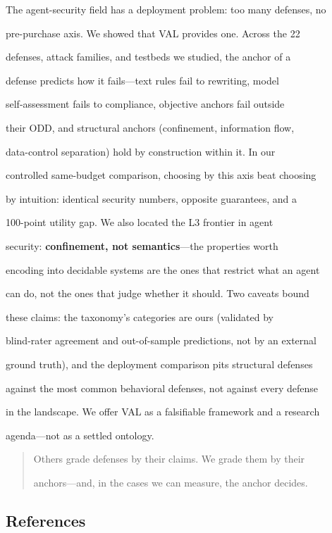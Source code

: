 \documentclass[

]{article}
\begin{document}
The agent-security field has a deployment problem: too many defenses, no

pre-purchase axis. We showed that VAL provides one. Across the 22

defenses, attack families, and testbeds we studied, the anchor of a

defense predicts how it fails---text rules fail to rewriting, model

self-assessment fails to compliance, objective anchors fail outside

their ODD, and structural anchors (confinement, information flow,

data-control separation) hold by construction within it. In our

controlled same-budget comparison, choosing by this axis beat choosing

by intuition: identical security numbers, opposite guarantees, and a

100-point utility gap. We also located the L3 frontier in agent

security: \textbf{confinement, not semantics}---the properties worth

encoding into decidable systems are the ones that restrict what an agent

can do, not the ones that judge whether it should. Two caveats bound

these claims: the taxonomy's categories are ours (validated by

blind-rater agreement and out-of-sample predictions, not by an external

ground truth), and the deployment comparison pits structural defenses

against the most common behavioral defenses, not against every defense

in the landscape. We offer VAL as a falsifiable framework and a research

agenda---not as a settled ontology.



\begin{quote}

Others grade defenses by their claims. We grade them by their

anchors---and, in the cases we can measure, the anchor decides.

\end{quote}



\subsection{References}\label{references}
\end{document}
